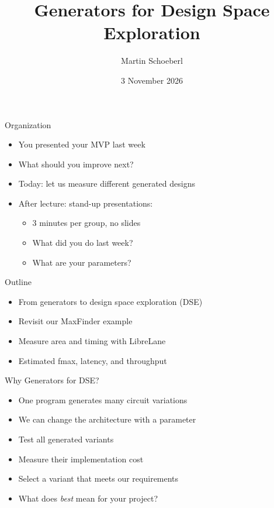 
\newif\ifbook


\title{Generators for Design Space Exploration}
\author{Martin Schoeberl}
\date{3 November 2026}

\begin{frame}
\titlepage
\end{frame}
\begin{frame}{Organization}
\begin{itemize}
\item You presented your MVP last week
\item What should you improve next?
\item Today: let us measure different generated designs
\item After lecture: stand-up presentations:
\begin{itemize}
\item 3 minutes per group, no slides
\item What did you do last week?
\item What are your parameters?
\end{itemize}
\end{itemize}
\end{frame}

\begin{frame}{Outline}
\begin{itemize}
\item From generators to design space exploration (DSE)
\item Revisit our MaxFinder example
\item Measure area and timing with LibreLane
\item Estimated fmax, latency, and throughput
\end{itemize}
\end{frame}

\begin{frame}{Why Generators for DSE?}
\begin{itemize}
\item One program generates many circuit variations
\item We can change the architecture with a parameter
\item Test all generated variants
\item Measure their implementation cost
\item Select a variant that meets our requirements
\item What does \emph{best} mean for your project?
\end{itemize}
\end{frame}

